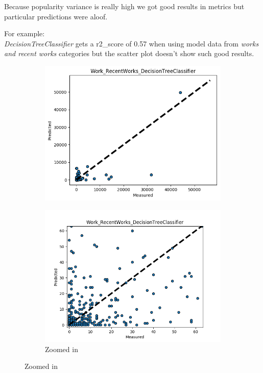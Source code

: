 \begin{frame}
Because popularity variance is really high we got good results in metrics but particular predictions were aloof.
\vspace{5pt}

For example:\\
\emph{DecisionTreeClassifier} gets a r2\_score of 0.57 when using model data from \emph{works and recent works} categories but the scatter plot doesn't show such good results.
\vspace{-15pt}

\begin{figure}
	\begin{subfigure}{.5\columnwidth}
		\includegraphics[scale=.36]{graphics/Work_RecentWorks_DecisionTreeClassifier.png} 
	\end{subfigure}%
	\begin{subfigure}{.5\columnwidth}
		\includegraphics[scale=.4]{graphics/Work_RecentWorks_DecisionTreeClassifierZOOM.png} 
		\caption{Zoomed in}
	\end{subfigure}
\end{figure}

\end{frame}

